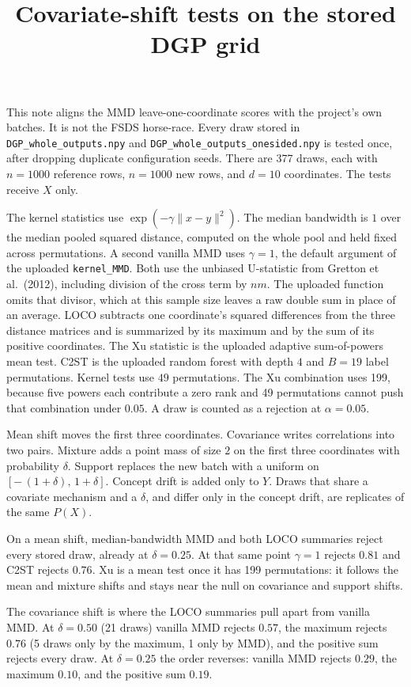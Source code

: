 \documentclass{article}
\title{Covariate-shift tests on the stored DGP grid}
\author{}
\date{}
\begin{document}
\maketitle

This note aligns the MMD leave-one-coordinate scores with the project's own
batches. It is not the FSDS horse-race. Every draw stored in
\texttt{DGP\_whole\_outputs.npy} and \texttt{DGP\_whole\_outputs\_onesided.npy}
is tested once, after dropping duplicate configuration seeds. There are 377
draws, each with $n=1000$ reference rows, $n=1000$ new rows, and $d=10$
coordinates. The tests receive $X$ only.

The kernel statistics use $\exp(-\gamma\|x-y\|^2)$. The median bandwidth is
$1$ over the median pooled squared distance, computed on the whole pool and
held fixed across permutations. A second vanilla MMD uses $\gamma=1$, the
default argument of the uploaded \texttt{kernel\_MMD}. Both use the unbiased
U-statistic from Gretton et al.\ (2012), including division of the cross term
by $nm$. The uploaded function omits that divisor, which at this sample size
leaves a raw double sum in place of an average. LOCO subtracts one coordinate's
squared differences from the three distance matrices and is summarized by its
maximum and by the sum of its positive coordinates. The Xu statistic is the
uploaded adaptive sum-of-powers mean test. C2ST is the uploaded random forest
with depth $4$ and $B=19$ label permutations. Kernel tests use $49$
permutations. The Xu combination uses 199, because five powers each contribute
a zero rank and 49 permutations cannot push that combination under $0.05$.
A draw is counted as a rejection at $\alpha=0.05$.

Mean shift moves the first three coordinates. Covariance writes correlations
into two pairs. Mixture adds a point mass of size $2$ on the first three
coordinates with probability $\delta$. Support replaces the new batch with
a uniform on $[-\,(1+\delta),\,1+\delta]$. Concept drift is added only to $Y$.
Draws that share a covariate mechanism and a $\delta$, and differ only in the
concept drift, are replicates of the same $P(X)$.

On a mean shift, median-bandwidth MMD and both LOCO summaries reject every
stored draw, already at $\delta=0.25$. At that same point $\gamma=1$ rejects
$0.81$ and C2ST rejects $0.76$. Xu is a mean test once it has 199 permutations:
it follows the mean and mixture shifts and stays near the null on covariance
and support shifts.

The covariance shift is where the LOCO summaries pull apart from vanilla MMD.
At $\delta=0.50$ (21 draws) vanilla MMD rejects $0.57$, the maximum rejects
$0.76$ (5 draws only by the maximum, 1 only by MMD), and the positive sum
rejects every draw. At $\delta=0.25$ the order reverses: vanilla MMD rejects
$0.29$, the maximum $0.10$, and the positive sum $0.19$.
\end{document}
